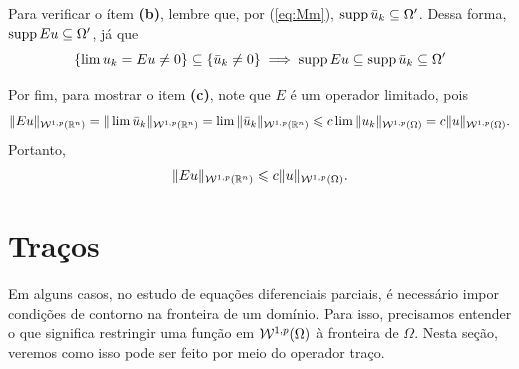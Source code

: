 \begin{prf}
    Para verificar o ítem \textbf{(b)}, lembre que, por (\ref{eq:Mm}), $\mathrm{supp}\, \bar u_k \subseteq \Omega'$.
    Dessa forma, $\mathrm{supp}\, Eu \subseteq \Omega'$, já que
    \[
        \{ \lim u_k = Eu \neq 0\} \subseteq \{ \bar u_k \neq 0 \} \implies \mathrm{supp}\, Eu \subseteq \mathrm{supp}\, \bar u_k \subseteq \Omega'
    \]

    Por fim, para mostrar o item \textbf{(c)}, note que $E$ é um operador limitado, pois
    \[
        \Vert Eu \Vert_{\mathcal{W}^{1,p}(\mathbb{R}^n)} = \Vert \lim \bar u_k \Vert_{\mathcal{W}^{1,p}(\mathbb{R}^n)} = \lim \Vert \bar u_k \Vert_{\mathcal{W}^{1,p}(\mathbb{R}^n)} \leqslant c \lim \Vert u_k \Vert_{\mathcal{W}^{1,p}(\Omega)} = c \Vert u \Vert_{\mathcal{W}^{1,p}(\Omega)}.
    \]
    Portanto,
    \[
        \Vert Eu \Vert_{\mathcal{W}^{1,p}(\mathbb{R}^n)} \leqslant c \Vert u \Vert_{\mathcal{W}^{1,p}(\Omega)}.
    \]
\end{prf}

\section{Traços}

Em alguns casos, no estudo de equações diferenciais parciais, é necessário impor condições de contorno na fronteira de um domínio. Para isso, precisamos entender o que significa restringir uma função em $\mathcal{W}^{1,p}(\Omega)$ à fronteira de $\Omega$. Nesta seção, veremos como isso pode ser feito por meio do operador traço.

